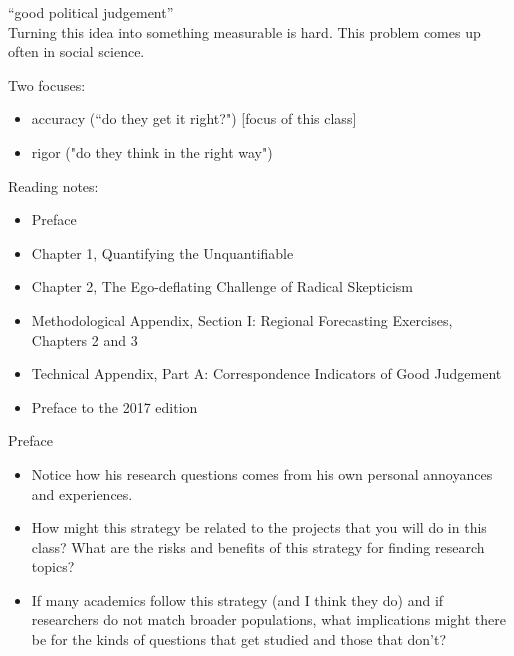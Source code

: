 \documentclass[aspectratio=169]{beamer}
\begin{document}
\begin{frame}

``good political judgement''\\
\pause
Turning this idea into something measurable is hard.  This problem comes up often in social science.

\pause
Two focuses:
\begin{itemize}
\item accuracy (``do they get it right?") [focus of this class]
\item rigor ("do they think in the right way")
\end{itemize}

\end{frame}
\begin{frame}

Reading notes:
\begin{itemize}
\item Preface
\item Chapter 1, Quantifying the Unquantifiable
\item Chapter 2, The Ego-deflating Challenge of Radical Skepticism
\item Methodological Appendix, Section I: Regional Forecasting Exercises, Chapters 2 and 3
\item Technical Appendix, Part A: Correspondence Indicators of Good Judgement
\item Preface to the 2017 edition
\end{itemize}

\end{frame}
\begin{frame}

Preface
\begin{itemize}
\item Notice how his research questions comes from his own personal annoyances and experiences.
\pause
\item How might this strategy be related to the projects that you will do in this class? What are the risks and benefits of this strategy for finding research topics?
\pause
\item If many academics follow this strategy (and I think they do) and if researchers do not match broader populations, what implications might there be for the kinds of questions that get studied and those that don't?
\end{itemize}

\end{frame}
\end{document}
